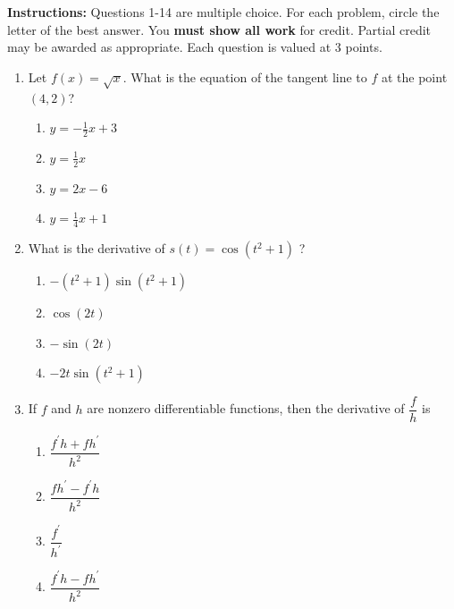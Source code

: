 \documentclass{article}
\begin{document}
\pagestyle{fancy}
\fancyhf{}
\renewcommand{\footrulewidth}{0.4pt}

\noindent
\textbf{Instructions:} Questions 1-14 are multiple choice. For each problem, circle the letter of the best answer.
You \textbf{must show all work} for credit. Partial credit may be awarded as appropriate. Each question is
valued at 3 points.
\begin{enumerate}
	\itemsep2em
	\item
	\begin{minipage}[t]{\linewidth}
		Let \(f(x)=\sqrt{x}\). What is the equation of the tangent line to \(f\)
at the point \((4,2)\)?\\[0.1em]
		\begin{enumerate}
		\itemsep1em
			\item  $y=-\frac{1}{2} x+3$
			\item  $y=\frac{1}{2} x$
			\item  $y=2 x-6$
			\item  $y=\frac{1}{4} x+1$
		\end{enumerate}
	\end{minipage}
	\item
	\begin{minipage}[t]{\linewidth}
		What is the derivative of \(s(t)=\cos \left(t^2 + 1\right)\) ?\\[0.1em]
		\begin{enumerate}
		\itemsep1em
			\item  $-(t^2+1)\sin(t^2+1)$
			\item  $\cos(2t)$
			\item  $-\sin(2t)$
			\item  $-2t\sin(t^2+1)$
		\end{enumerate}
	\end{minipage}
	\item
	\begin{minipage}[t]{\linewidth}
		If \(f\) and \(h\) are nonzero differentiable functions, then the
derivative of \(\dfrac{f}{h}\) is\\[0.1em]
		\begin{enumerate}
		\itemsep1em
			\item  $\dfrac{f^{\prime} h + f h^{\prime}}{h^2}$
			\item  $\dfrac{f h^{\prime} - f^{\prime} h}{h^{2}}$
			\item  $\dfrac{f^{\prime}}{h^{\prime}}$
			\item  $\dfrac{f^{\prime} h - f h^{\prime}}{h^2}$
		\end{enumerate}

\end{minipage}
\end{enumerate}
\end{document}
